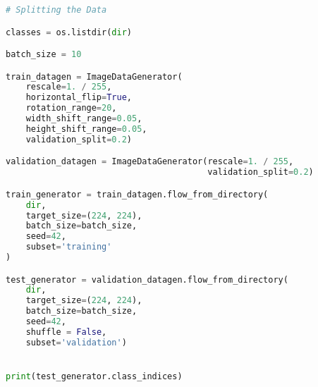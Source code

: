 \begin{lstlisting}[language=Python]
# Splitting the Data

classes = os.listdir(dir)

batch_size = 10

train_datagen = ImageDataGenerator(
    rescale=1. / 255,
    horizontal_flip=True,
    rotation_range=20,
    width_shift_range=0.05,
    height_shift_range=0.05,
    validation_split=0.2)

validation_datagen = ImageDataGenerator(rescale=1. / 255,
                                        validation_split=0.2)

train_generator = train_datagen.flow_from_directory(
    dir,
    target_size=(224, 224),
    batch_size=batch_size,
    seed=42,
    subset='training'
)

test_generator = validation_datagen.flow_from_directory(
    dir,
    target_size=(224, 224),
    batch_size=batch_size,
    seed=42,
    shuffle = False,
    subset='validation')


print(test_generator.class_indices)

\end{lstlisting}
